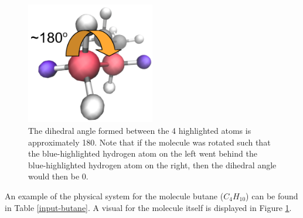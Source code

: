 \documentclass[12pt]{article}
\begin{document}
\begin{figure}[H]
	\begin{center}
	\includegraphics[width=0.5\textwidth]{butane-dihedral}
	\end{center}
	\caption{The dihedral angle formed between the 4 highlighted atoms is 
	approximately 180\textdegree. Note that if the molecule was rotated such 
	that the blue-highlighted hydrogen atom on the left went behind the 
	blue-highlighted hydrogen atom on the right, then the dihedral angle would 
	then be 0\textdegree.}
	\label{butane-dihedral}
\end{figure}

An example of the physical system for the molecule butane ($C_4H_{10}$) can be 
found in Table \ref{input-butane}. A visual for the molecule itself is 
displayed in Figure \ref{butane-dihedral}.
\end{document}
